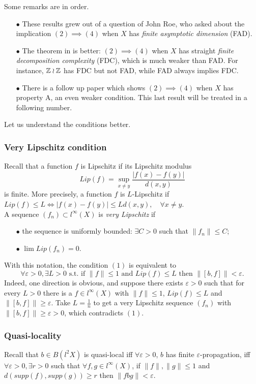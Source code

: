 Some remarks are in order. 
\begin{itemize}
\item[$\bullet$] These results grew out of a question of John Roe, who asked about the implication $(2) \implies (4)$ when $X$ has \textit{finite asymptotic dimension} (FAD).
\item[$\bullet$] The theorem in \cite{spakula2017relative} is better: $(2)\implies (4)$ when $X$ has straight \textit{finite decomposition complexity} (FDC), which is much weaker than FAD. For instance, $\mathbb Z \wr \mathbb Z$ has FDC but not FAD, while FAD always implies FDC.
\item[$\bullet$] There is a follow up paper which shows $(2)\implies (4)$ when $X$ has property A, an even weaker condition. This last result will be treated in a following number.
\end{itemize}

Let us understand the conditions better.

\subsubsection*{Very Lipschitz condition} Recall that a function $f$ is Lipschitz if its Lipschitz modulus 
\[Lip(f) = \sup_{x\neq y} \frac{|f(x) - f(y)|}{d(x,y)}\]
is finite. More precisely, a function $f$ is $L$-Lipschitz if $Lip(f) \leq L \iff |f(x)-f(y)|\leq L d(x,y), \quad \forall x \neq y $.\\

A sequence $(f_n)\subset l^\infty (X)$ is \textit{very Lipschitz} if
\begin{itemize}
\item[$\bullet$] the sequence is uniformly bounded: $\exists C> 0 $ such that $\| f_n \| \leq C$;
\item[$\bullet$] $\lim Lip(f_n) = 0$.
\end{itemize} 
With this notation, the condition $(1)$ is equivalent to 
\[\forall \varepsilon > 0 , \exists L> 0 \text{ s.t. if } \|f \| \leq 1 \text{ and } Lip(f)\leq L \text{ then } \| [b,f] \| <\varepsilon. \]
Indeed, one direction is obvious, and suppose there exists $\varepsilon > 0 $ such that for every $L> 0$ there is a $f\in l^\infty (X)$ with $\| f\| \leq 1$, $Lip(f)\leq L $ and $\| [b, f ] \| \geq \varepsilon$. Take $L=\frac{1}{n}$ to get a very Lipschitz sequence $(f_n)$ with $\| [b,f]\| \geq \varepsilon > 0$, which contradicts $(1)$.\\

\subsubsection*{Quasi-locality} Recall that $b\in B(l^2X)$ is quasi-local iff $\forall \varepsilon> 0$, $b$ has finite $\varepsilon$-propagation,
iff $\forall \varepsilon > 0, \exists  r > 0$ such that $\forall f,g \in l^\infty (X)$, if $\|f\| , \|g\| \leq 1 $ and $d(supp(f), supp(g))\geq r$ then $\| fbg \| < \varepsilon$.\\

